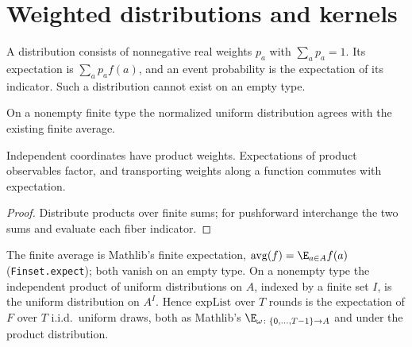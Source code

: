 \section{Weighted distributions and kernels}
\begin{definition}\label{def:distribution}
\leanok
A distribution consists of nonnegative real weights $p_a$ with $\sum_a p_a=1$.
Its expectation is $\sum_a p_a f(a)$, and an event probability is the expectation
of its indicator. Such a distribution cannot exist on an empty type.
\end{definition}
\begin{lemma}\label{lem:uniform-agreement}
\leanok{}
On a nonempty finite type the normalized uniform distribution agrees with the
existing finite average.
\end{lemma}
\begin{lemma}\label{lem:weighted-product}
\leanok{}
Independent coordinates have product weights. Expectations of product
observables factor, and transporting weights along a function commutes with expectation.
\end{lemma}
\begin{proof}\leanok
Distribute products over finite sums; for pushforward interchange the two sums
and evaluate each fiber indicator.
\end{proof}
\begin{lemma}\label{lem:bridge}
\leanok{}
The finite average is Mathlib's finite expectation, $\operatorname{avg}(f)=\E_{a\in A}f(a)$
(\texttt{Finset.expect}); both vanish on an empty type. On a nonempty type the independent
product of uniform distributions on $A$, indexed by a finite set $I$, is the uniform
distribution on $A^I$. Hence $\mathrm{expList}$ over $T$ rounds is the expectation of
$F$ over $T$ i.i.d.\ uniform draws, both as Mathlib's $\E_{\omega\colon\{0,\ldots,T-1\}\to A}$
and under the product distribution.
\end{lemma}
